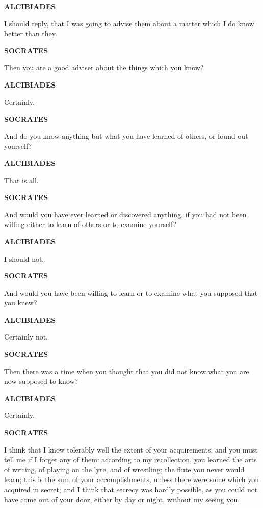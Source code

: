\documentclass[11pt,letter]{article}
\begin{document}
\par \textbf{ALCIBIADES}
\par   I should reply, that I was going to advise them about a matter which I do know better than they.

\par \textbf{SOCRATES}
\par   Then you are a good adviser about the things which you know?

\par \textbf{ALCIBIADES}
\par   Certainly.

\par \textbf{SOCRATES}
\par   And do you know anything but what you have learned of others, or found out yourself?

\par \textbf{ALCIBIADES}
\par   That is all.

\par \textbf{SOCRATES}
\par   And would you have ever learned or discovered anything, if you had not been willing either to learn of others or to examine yourself?

\par \textbf{ALCIBIADES}
\par   I should not.

\par \textbf{SOCRATES}
\par   And would you have been willing to learn or to examine what you supposed that you knew?

\par \textbf{ALCIBIADES}
\par   Certainly not.

\par \textbf{SOCRATES}
\par   Then there was a time when you thought that you did not know what you are now supposed to know?

\par \textbf{ALCIBIADES}
\par   Certainly.

\par \textbf{SOCRATES}
\par   I think that I know tolerably well the extent of your acquirements; and you must tell me if I forget any of them:  according to my recollection, you learned the arts of writing, of playing on the lyre, and of wrestling; the flute you never would learn; this is the sum of your accomplishments, unless there were some which you acquired in secret; and I think that secrecy was hardly possible, as you could not have come out of your door, either by day or night, without my seeing you.
\end{document}
